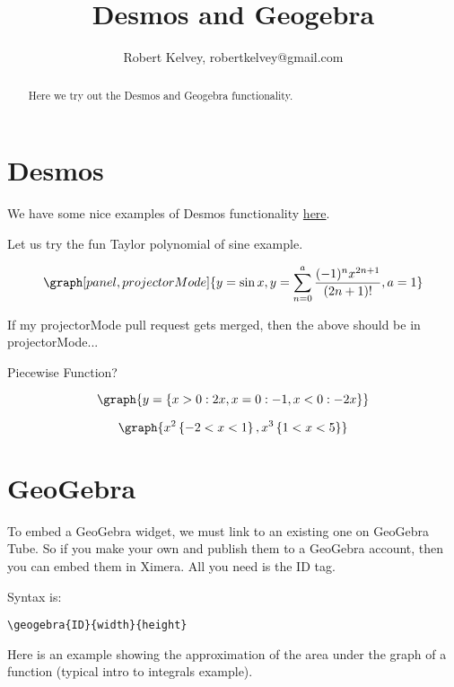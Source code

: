 \documentclass{ximera}
\title{Desmos and Geogebra}
\author{Robert Kelvey, robertkelvey@gmail.com}
\begin{document}
\begin{abstract}
Here we try out the Desmos and Geogebra functionality.
\end{abstract}
\maketitle

\section{Desmos}

We have some nice examples of Desmos functionality  \href{http://ximera.osu.edu/course/jackschmidt/ximeraActivity/master/desmos}{here}. 

Let us try the fun Taylor polynomial of sine example.

\[
    \graph[panel, projectorMode]{y=\sin x, y=\sum _{n=0}^a\frac{(-1)^n x^{2n+1}}{(2n+1)!}, a=1}
\]

If my projectorMode pull request gets merged, then the above should be in projectorMode...


Piecewise Function?

\[
    \graph{y=\left\{x>0:2x, x=0:-1, x<0:-2x\right\}}
\]

\[
    \graph{ x^2\left\{-2 < x < 1 \right\}, x^3 \left\{1<x<5\right\}}
\]


\section{GeoGebra}

To embed a GeoGebra widget, we must link to an existing one on GeoGebra Tube. So if you make your own and publish them to a GeoGebra account, then you can embed them in Ximera. All you need is the ID tag.

Syntax is: \begin{verbatim}\geogebra{ID}{width}{height} \end{verbatim}

Here is an example showing the approximation of the area under the graph of a function (typical intro to integrals example).

\end{document}
